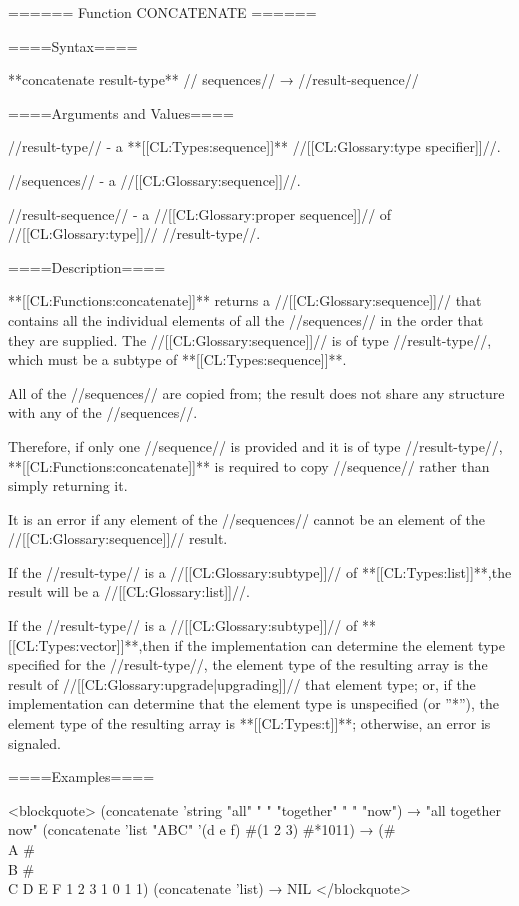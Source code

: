 ====== Function CONCATENATE ======

====Syntax====

**concatenate {result-type** //\rest} sequences// → //result-sequence//

====Arguments and Values====

//result-type// - a **[[CL:Types:sequence]]** //[[CL:Glossary:type specifier]]//.

//sequences// - a //[[CL:Glossary:sequence]]//.

//result-sequence// - a //[[CL:Glossary:proper sequence]]// of //[[CL:Glossary:type]]// //result-type//.

====Description====

**[[CL:Functions:concatenate]]** returns a //[[CL:Glossary:sequence]]// that contains all the individual elements of all the //sequences// in the order that they are supplied. The //[[CL:Glossary:sequence]]// is of type //result-type//, which must be a subtype of **[[CL:Types:sequence]]**.

All of the //sequences// are copied from; the result does not share any structure with any of the //sequences//.

Therefore, if only one //sequence// is provided and it is of type //result-type//, **[[CL:Functions:concatenate]]** is required to copy //sequence// rather than simply returning it.

It is an error if any element of the //sequences// cannot be an element of the //[[CL:Glossary:sequence]]// result. 

If the //result-type// is a //[[CL:Glossary:subtype]]// of **[[CL:Types:list]]**,the result will be a //[[CL:Glossary:list]]//.

If the //result-type// is a //[[CL:Glossary:subtype]]// of **[[CL:Types:vector]]**,then if the implementation can determine the element type specified for the //result-type//, the element type of the resulting array is the result of //[[CL:Glossary:upgrade|upgrading]]// that element type; or, if the implementation can determine that the element type is unspecified (or ''*''), the element type of the resulting array is **[[CL:Types:t]]**; otherwise, an error is signaled.

====Examples====

<blockquote> (concatenate 'string "all" " " "together" " " "now") → "all together now" (concatenate 'list "ABC" '(d e f) #(1 2 3) #*1011) → (#\\A #\\B #\\C D E F 1 2 3 1 0 1 1) (concatenate 'list) → NIL </blockquote>

